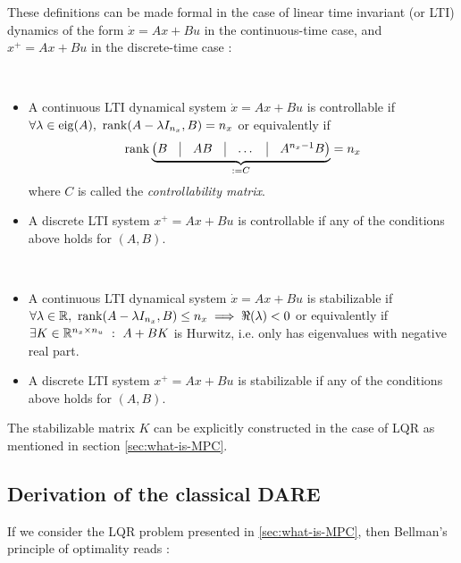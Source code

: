 \documentclass[12pt]{article}
\begin{document}
These definitions can be made formal in the case of linear time invariant (or LTI) dynamics of the form $\dot{x}=Ax+Bu$ in the continuous-time case, and $x^+=Ax+Bu$ in the discrete-time case :
\begin{definition}[Controllability]~
	\begin{itemize}[label=\textbullet]
		\item A continuous LTI dynamical system $\dot{x}=Ax+Bu$ is controllable if $\forall\lambda\in\mathrm{eig}(A),~\operatorname{rank}(A-\lambda I_{n_x},B)=n_x$ or equivalently if
		$$\rank\underbrace{\begin{pmatrix}B&\vline& AB&\vline&\dots&\vline&A^{n_x-1}B\end{pmatrix}}_{:=C}=n_x$$
		where $C$ is called the \textit{controllability matrix}.

		\item A discrete LTI system $x^+=Ax+Bu$ is controllable if any of the conditions above holds for $(A,B)$.
	\end{itemize}
\end{definition}
\begin{definition}[Stabilizability]~
	\begin{itemize}[label=\textbullet]
		\item A continuous LTI dynamical system $\dot{x}=Ax+Bu$ is stabilizable if $\forall\lambda\in\mathbb{R},~\operatorname{rank}(A-\lambda I_{n_x},B)\leq n_x\implies \Re(\lambda)< 0$ or equivalently if $\exists K\in\mathbb{R}^{n_x\times n_u}~:~A+BK$ is Hurwitz, i.e. only has eigenvalues with negative real part.

		\item A discrete LTI system $x^+=Ax+Bu$ is stabilizable if any of the conditions above holds for $(A,B)$.
	\end{itemize}
\end{definition}

\begin{remark}
	The stabilizable matrix $K$ can be explicitly constructed in the case of LQR as mentioned in section \ref{sec:what-is-MPC}.
\end{remark}

\subsection*{Derivation of the classical DARE}\label{sec:DARE}

If we consider the LQR problem presented in \ref{sec:what-is-MPC}, then Bellman's principle of optimality reads :
\end{document}
